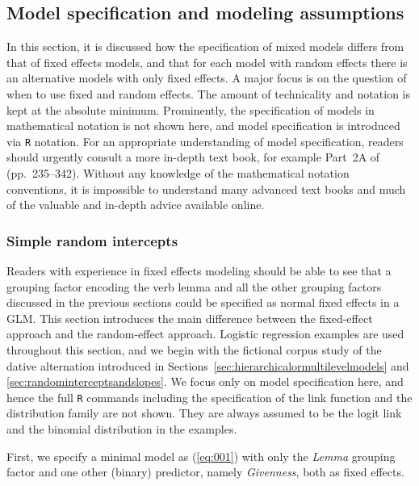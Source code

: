 \subsection{Model specification and modeling assumptions}
\label{sec:modelspecificationandmodelingassumptions}

In this section, it is discussed how the specification of mixed models differs from that of fixed effects models, and that for each model with random effects there is an alternative models with only fixed effects.
A major focus is on the question of when to use fixed and random effects.
The amount of technicality and notation is kept at the absolute minimum.
Prominently, the specification of models in mathematical notation is not shown here, and model specification is introduced via \texttt{R} notation.
For an appropriate understanding of model specification, readers should urgently consult a more in-depth text book, for example Part~2A of \citet{GelmanHill2006} (pp.~235--342).
Without any knowledge of the mathematical notation conventions, it is impossible to understand many advanced text books and much of the valuable and in-depth advice available online.

\subsubsection{Simple random intercepts}
\label{sec:simplerandomintercepts}

Readers with experience in fixed effects modeling should be able to see that a grouping factor encoding the verb lemma and all the other grouping factors discussed in the previous sections could be specified as normal fixed effects in a GLM.
This section introduces the main difference between the fixed-effect approach and the random-effect approach.
Logistic regression examples are used throughout this section, and we begin with the fictional corpus study of the dative alternation introduced in Sections~\ref{sec:hierarchicalormultilevelmodels} and \ref{sec:randominterceptsandslopes}.
We focus only on model specification here, and hence the full \texttt{R} commands including the specification of the link function and the distribution family are not shown.
They are always assumed to be the logit link and the binomial distribution in the examples.

First, we specify a minimal model as (\ref{eq:001}) with only the \textit{Lemma} grouping factor and one other (binary) predictor, namely \textit{Givenness}, both as fixed effects.

